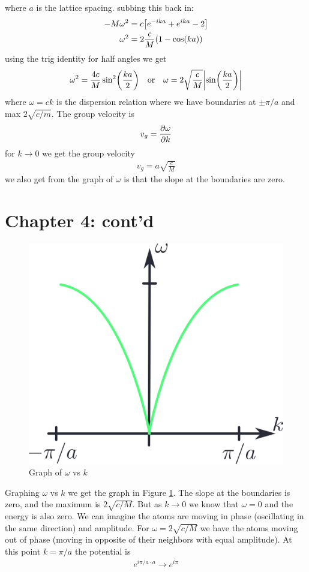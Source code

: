 \documentclass[../main.tex]{subfiles}
\begin{document}
where $a$ is the lattice spacing. subbing this back in:
\begin{align*}
    -M \omega^2 &= c \qt[e^{-ika} + e^{ika} - 2] \\
    \omega^2 &= 2 \frac{c}{M} (1 - \cos(ka))
\end{align*}
using the trig identity for half angles we get 
\begin{align*}
    \omega^2 = \frac{4c}{M} \sin[2](\frac{ka}{2}) \qor
    \omega = 2\sqrt{\frac{c}{M}} \abs{\sin(\frac{ka}{2})}
\end{align*}
where $\omega = ck$ is the dispersion relation where we have boundaries at
$\pm \pi/a$ and max $2\sqrt{c/m}$. The group velocity is
\begin{align*}
    v_g = \pdv{\omega}{k}
\end{align*}
for $k \to 0$ we get the group velocity
\begin{align*}
    v_g = a \sqrt{\frac{c}{M}}
\end{align*}
we also get from the graph of $\omega$ is that the slope at the boundaries are zero. 


\pagebreak
{}

\section*{Chapter 4: cont'd}
\begin{figure} [ht]
    \centering
    \includegraphics[width=0.4\linewidth]{phonon1.png}
    \caption{Graph of $\omega$ vs $k$}
    \label{fig:5.1}
\end{figure}

Graphing $\omega$ vs $k$ we get the graph in Figure \ref{fig:5.1}. The slope at the boundaries is
zero, and the maximum is $2\sqrt{c/M}$. But as $k \to 0$ we know that $\omega = 0$ and the energy
is also zero. We can imagine the atoms are moving in phase (oscillating in the same direction) and
amplitude. For $\omega = 2\sqrt{c/M}$ we have the atoms moving out of phase (moving in opposite of
their neighbors with equal amplitude). At this point $k = \pi/a$ the potential is
\begin{align*}
    e^{i\pi/a \cdot a} \to e^{i\pi}
\end{align*}
\end{document}
